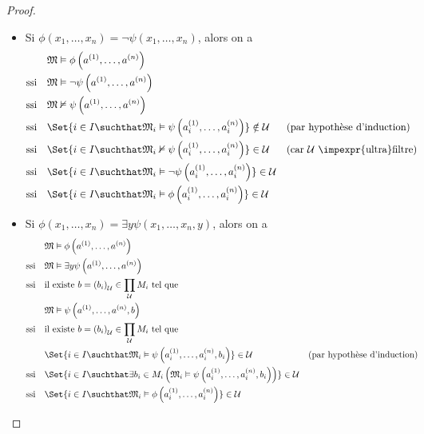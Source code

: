 \begin{proof}
\begin{itemize}
		\item Si $\phi\left(x_{1},\dots,x_{n}\right)=\neg\psi\left(x_{1},\dots,x_{n}\right)$, alors on a
		\begin{align*}
			&\quad\mathfrak{M}\vDash\phi\left(a^{\left(1\right)},\dots,a^{\left(n\right)}\right)\\
			\text{ssi}&\quad\mathfrak{M}\vDash\neg\psi\left(a^{\left(1\right)},\dots,a^{\left(n\right)}\right)\\
			\text{ssi}&\quad\mathfrak{M}\nvDash\psi\left(a^{\left(1\right)},\dots,a^{\left(n\right)}\right)\\
			\text{ssi}&\quad\Set{i\in I\suchthat\mathfrak{M}_{i}\vDash\psi\left(a_{i}^{\left(1\right)},\dots,a_{i}^{\left(n\right)}\right)}\notin\mathcal{U}&&\text{(par hypothèse d'induction)}\\
			\text{ssi}&\quad\Set{i\in I\suchthat\mathfrak{M}_{i}\nvDash\psi\left(a_{i}^{\left(1\right)},\dots,a_{i}^{\left(n\right)}\right)}\in\mathcal{U}&&\text{(car }\mathcal{U}\text{ \impexpr{ultra}filtre)}\\
			\text{ssi}&\quad\Set{i\in I\suchthat\mathfrak{M}_{i}\vDash\neg\psi\left(a_{i}^{\left(1\right)},\dots,a_{i}^{\left(n\right)}\right)}\in\mathcal{U}\\
			\text{ssi}&\quad\Set{i\in I\suchthat\mathfrak{M}_{i}\vDash\phi\left(a_{i}^{\left(1\right)},\dots,a_{i}^{\left(n\right)}\right)}\in\mathcal{U}
		\end{align*}
		
		\item Si $\phi\left(x_{1},\dots,x_{n}\right)=\exists y\psi\left(x_{1},\dots,x_{n},y\right)$, alors on a
		\begin{align*}
			&\quad\mathfrak{M}\vDash\phi\left(a^{\left(1\right)},\dots,a^{\left(n\right)}\right)\\
			\text{ssi}&\quad\mathfrak{M}\vDash\exists y\psi\left(a^{\left(1\right)},\dots,a^{\left(n\right)}\right)\\
			\text{ssi}&\quad\text{il existe }b=\left(b_{i}\right)_{\mathcal{U}}\in\prod_{\mathcal{U}}M_{i}\text{ tel que}\\
			&\quad\mathfrak{M}\vDash\psi\left(a^{\left(1\right)},\dots,a^{\left(n\right)},b\right)\\
			\text{ssi}&\quad\text{il existe }b=\left(b_{i}\right)_{\mathcal{U}}\in\prod_{\mathcal{U}}M_{i}\text{ tel que}\\
			&\quad\Set{i\in I\suchthat\mathfrak{M}_{i}\vDash\psi\left(a_{i}^{\left(1\right)},\dots,a_{i}^{\left(n\right)},b_{i}\right)}\in\mathcal{U}&&\text{(par hypothèse d'induction)}\\
			\text{ssi}&\quad\Set{i\in I\suchthat\exists b_{i}\in M_{i}\left(\mathfrak{M}_{i}\vDash\psi\left(a_{i}^{\left(1\right)},\dots,a_{i}^{\left(n\right)},b_{i}\right)\right)}\in\mathcal{U}\\
			\text{ssi}&\quad\Set{i\in I\suchthat\mathfrak{M}_{i}\vDash\phi\left(a_{i}^{\left(1\right)},\dots,a_{i}^{\left(n\right)}\right)}\in\mathcal{U}
		\end{align*}
	\end{itemize}
\end{proof}

